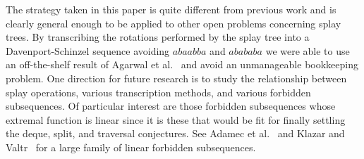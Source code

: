 \documentclass{article}
\begin{document}
The strategy taken in this paper is quite different from previous work and is clearly general
enough to be applied to other open problems concerning splay trees.
By transcribing the rotations performed by the splay tree into a Davenport-Schinzel sequence
avoiding $abaabba$ and $abababa$ we were able to use an off-the-shelf result of Agarwal et al.~\cite{ASS89}
and avoid an unmanageable bookkeeping problem.
One direction for future research is to study the relationship between splay operations,
various transcription methods, and various forbidden subsequences.  
Of particular interest are those forbidden subsequences whose extremal function is linear
since it is these that would be fit for finally settling the deque, split, and traversal conjectures.
See Adamec et al.~\cite{AKV92} and Klazar and Valtr~\cite{KV94}  for a large family of 
linear forbidden subsequences.

{\small


}
\end{document}
